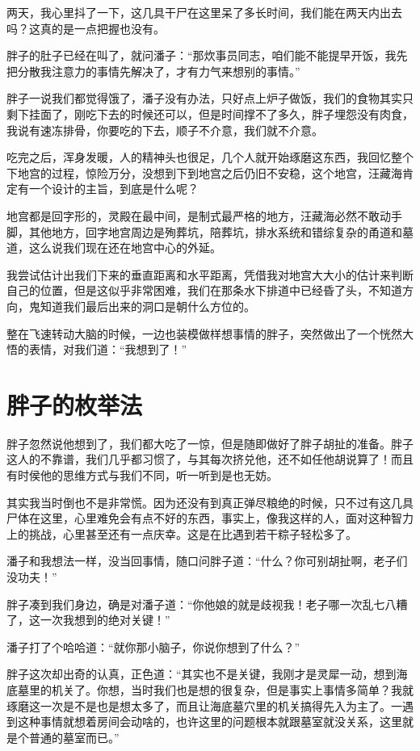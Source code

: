 两天，我心里抖了一下，这几具干尸在这里呆了多长时间，我们能在两天内出去吗？这真的是一点把握也没有。

胖子的肚子已经在叫了，就问潘子：“那炊事员同志，咱们能不能提早开饭，我先把分散我注意力的事情先解决了，才有力气来想别的事情。”

胖子一说我们都觉得饿了，潘子没有办法，只好点上炉子做饭，我们的食物其实只剩下挂面了，刚吃下去的时候还可以，但是时间撑不了多久，胖子埋怨没有肉食，我说有速冻排骨，你要吃的下去，顺子不介意，我们就不介意。

吃完之后，浑身发暖，人的精神头也很足，几个人就开始琢磨这东西，我回忆整个下地宫的过程，惊险万分，没想到下到地宫之后仍旧不安稳，这个地宫，汪藏海肯定有一个设计的主旨，到底是什么呢？

地宫都是回字形的，灵殿在最中间，是制式最严格的地方，汪藏海必然不敢动手脚，其他地方，回字地宫周边是殉葬坑，陪葬坑，排水系统和错综复杂的甬道和墓道，这么说我们现在还在地宫中心的外延。

我尝试估计出我们下来的垂直距离和水平距离，凭借我对地宫大大小的估计来判断自己的位置，但是这似乎非常困难，我们在那条水下排道中已经昏了头，不知道方向，鬼知道我们最后出来的洞口是朝什么方位的。

整在飞速转动大脑的时候，一边也装模做样想事情的胖子，突然做出了一个恍然大悟的表情，对我们道：“我想到了！”

\chapter{胖子的枚举法}

胖子忽然说他想到了，我们都大吃了一惊，但是随即做好了胖子胡扯的准备。胖子这人的不靠谱，我们几乎都习惯了，与其每次挤兑他，还不如任他胡说算了！而且有时侯他的思维方式与我们不同，听一听到是也无妨。

其实我当时倒也不是非常慌。因为还没有到真正弹尽粮绝的时候，只不过有这几具尸体在这里，心里难免会有点不好的东西，事实上，像我这样的人，面对这种智力上的挑战，心里甚至还有一点庆幸。这是在比遇到若干粽子轻松多了。

潘子和我想法一样，没当回事情，随口问胖子道：“什么？你可别胡扯啊，老子们没功夫！”

胖子凑到我们身边，确是对潘子道：“你他娘的就是歧视我！老子哪一次乱七八糟了，这一次我想到的绝对关键！”

潘子打了个哈哈道：“就你那小脑子，你说你想到了什么？”

胖子这次却出奇的认真，正色道：“其实也不是关键，我刚才是灵犀一动，想到海底墓里的机关了。你想，当时我们也是想的很复杂，但是事实上事情多简单？我就琢磨这一次是不是也是想太多了，而且让海底墓穴里的机关搞得先入为主了。一遇到这种事情就想着房间会动啥的，也许这里的问题根本就跟墓室就没关系，这里就是个普通的墓室而已。”

